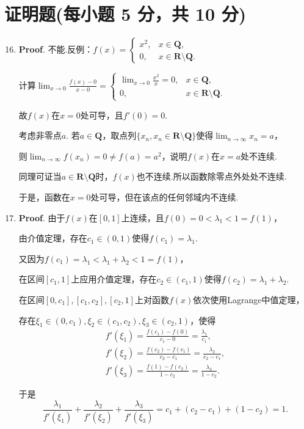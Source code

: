 \documentclass[../Main.tex]{subfiles}
\begin{document}
\section{证明题(每小题 5 分，共 10 分)}
\begin{enumerate}
    \setcounter{enumi}{15}
    \item \textbf{Proof}. 不能.反例：$f(x)=
              \begin{cases}
                  x^{2}, & x\in\mathbf{Q},                    \\
                  0,     & x\in\mathbf{R}\setminus\mathbf{Q}.
              \end{cases}$

          计算$\lim_{x\to0}\frac{f(x)-0}{x-0}=
              \begin{cases}
                  \lim_{x\to0}\frac{x^2}{x}=0, & x\in\mathbf{Q},                    \\
                  0,                           & x\in\mathbf{R}\setminus\mathbf{Q}.
              \end{cases}$

          故$f(x)$在$x=0$处可导，且$f'(0)=0$.

          考虑非零点$a$. 若$a\in\mathbf{Q}$，取点列$\{x_{n},x_{n}\in\mathbf{R}\setminus
              \mathbf{Q}\}$使得$\lim_{n\to\infty}x_{n}=a$，

          则$\lim_{n\to\infty}f(x_{n})=0\neq f(a)=a^{2}$，说明$f(x)$在$x=a$处不连续.

          同理可证当$a\in\mathbf{R}\setminus\mathbf{Q}$时，$f(x)$也不连续.所以函数除零点外处处不连续.

          于是，函数在$x=0$处可导，但在该点的任何邻域内不连续.

    \item \textbf{Proof}. 由于$f(x)$在$[0,1]$上连续，且$f(0)=0 < \lambda_{1}
              < 1=f(1)$，

          由介值定理，存在$c_{1}\in(0,1)$使得$f(c_{1})=\lambda_{1}$.

          又因为$f(c_{1})=\lambda_{1} < \lambda_{1}+\lambda_{2} < 1=f(1)$，

          在区间$[c_{1}, 1]$上应用介值定理，存在$c_{2}\in(c_{1},1)$使得$f(c_{2})=\lambda
              _{1}+\lambda_{2}$.

          在区间$[0,c_{1}],[c_{1},c_{2}],[c_{2},1]$上对函数$f(x)$依次使用Lagrange中值定理，

          存在$\xi_{1}\in(0,c_{1}),\xi_{2}\in(c_{1},c_{2}),\xi_{3}\in(c_{2},1)$，使得
          \[
              \begin{gathered}
                  f'(\xi_1)=\frac{f(c_{1})-f(0)}{c_{1}-0}=\frac{\lambda_{1}}{c_{1}}, \\
                  f'(\xi_2)=\frac{f(c_{2})-f(c_{1})}{c_{2}-c_{1}}=\frac{\lambda_{2}}{c_{2}-c_{1}},
                  \\
                  f'(\xi_3)=\frac{f(1)-f(c_{2})}{1-c_{2}}=\frac{\lambda_{3}}{1-c_{2}}.
              \end{gathered}
          \]

          于是
          \[
              \frac{\lambda_{1}}{f'(\xi_{1})}+\frac{\lambda_{2}}{f'(\xi_{2})}+\frac{\lambda_{3}}{f'(\xi_{3})}
              =c_{1}+(c_{2}-c_{1})+(1-c_{2})=1.
          \]
\end{enumerate}
\end{document}
